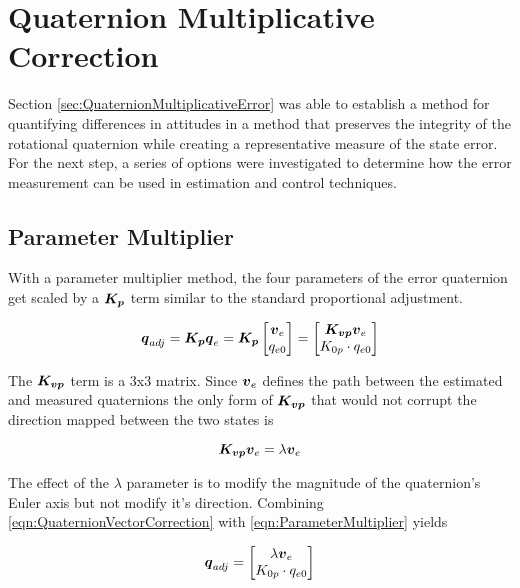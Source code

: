 \section{Quaternion Multiplicative Correction}
\label{sec:QuaternionMultiplicativeCorrection}

Section \ref{sec:QuaternionMultiplicativeError} was able to establish a method for quantifying differences in attitudes in a method that preserves the integrity of the rotational quaternion while creating a representative measure of the state error.  For the next step, a series of options were investigated to determine how the error measurement can be used in estimation and control techniques.

\subsection{Parameter Multiplier}
\label{subsec:ParameterMultiplier}

With a parameter multiplier method, the four parameters of the error quaternion get scaled by a $\boldsymbol{K_p}$ term similar to the standard proportional adjustment.

\begin{equation}
  \boldsymbol{q}_{adj} = \boldsymbol{K_p} \boldsymbol{q}_e
    = \boldsymbol{K_p} \begin{bmatrix} \boldsymbol{v}_e \\ q_{e0} \end{bmatrix}
    = \begin{bmatrix} \boldsymbol{K_{vp}}\boldsymbol{v}_e \\ K_{0p} \cdot q_{e0} \end{bmatrix}
  \label{eqn:ParameterMultiplier}
\end{equation}

The $\boldsymbol{K_{vp}}$ term is a 3x3 matrix.  Since $\boldsymbol{v}_e$ defines the path between the estimated and measured quaternions the only form of $\boldsymbol{K_{vp}}$ that would not corrupt the direction mapped between the two states is

\begin{equation}
  \boldsymbol{K_{vp}} \boldsymbol{v}_e = \lambda \boldsymbol{v}_e
  \label{eqn:QuaternionVectorCorrection}
\end{equation}

The effect of the $\lambda$ parameter is to modify the magnitude of the quaternion's Euler axis but not modify it's direction.  Combining \ref{eqn:QuaternionVectorCorrection} with \ref{eqn:ParameterMultiplier} yields

\begin{equation}
  \boldsymbol{q}_{adj} = \begin{bmatrix} \lambda \boldsymbol{v}_e \\ K_{0p} \cdot q_{e0} \end{bmatrix}
  \label{eqn:QuaternionScalarMultiplier}
\end{equation}

